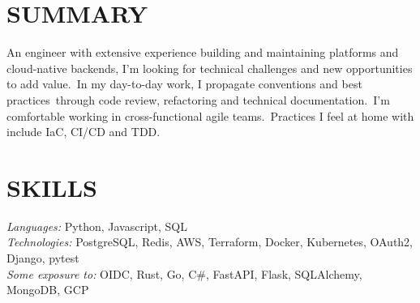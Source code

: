 \documentclass[line,margin]{res}
\begin{document}
\address{}
\address{\href{mailto://simon.r.crowe@protonmail.com}{simon.r.crowe@protonmail.com}}


\begin{resume}

\section{SUMMARY} An engineer with extensive experience building and maintaining
                  platforms and cloud-native backends, I'm looking for technical challenges
                  and new opportunities to add value.\
                  In my day-to-day work, I propagate conventions and best practices\
                  through code review, refactoring and technical documentation.\
                  I’m comfortable working in cross-functional agile teams.\
                  Practices I feel at home with include IaC, CI/CD and TDD.

\section{SKILLS} {\sl Languages:} Python, Javascript, SQL \\
                {\sl Technologies:} PostgreSQL, Redis, AWS, Terraform, Docker, Kubernetes, OAuth2, Django, pytest \\
                {\sl Some exposure to:} OIDC, Rust, Go, C\#, FastAPI, Flask, SQLAlchemy, MongoDB, GCP



\end{resume}
\end{document}
